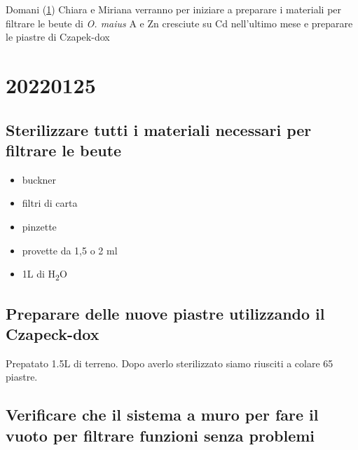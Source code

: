 \documentclass[
]{book}
\providecommand{\tightlist}{%
  \setlength{\itemsep}{0pt}\setlength{\parskip}{0pt}}
\begin{document}
Domani (\ref{D20220125}) Chiara e Miriana verranno per iniziare a preparare i materiali per filtrare le beute di \emph{O. maius} A e Zn cresciute su Cd nell'ultimo mese e preparare le piastre di Czapek-dox

\hypertarget{D20220125}{%
\section{20220125}\label{D20220125}}

\hypertarget{sterilizzare-tutti-i-materiali-necessari-per-filtrare-le-beute}{%
\subsection{Sterilizzare tutti i materiali necessari per filtrare le beute}\label{sterilizzare-tutti-i-materiali-necessari-per-filtrare-le-beute}}

\begin{itemize}
\tightlist
\item
  buckner\\
\item
  filtri di carta\\
\item
  pinzette\\
\item
  provette da 1,5 o 2 ml\\
\item
  1L di H\textsubscript{2}O
\end{itemize}

\hypertarget{preparare-delle-nuove-piastre-utilizzando-il-czapeck-dox}{%
\subsection{Preparare delle nuove piastre utilizzando il Czapeck-dox}\label{preparare-delle-nuove-piastre-utilizzando-il-czapeck-dox}}

Prepatato 1.5L di terreno. Dopo averlo sterilizzato siamo riusciti a colare 65 piastre.

\hypertarget{verificare-che-il-sistema-a-muro-per-fare-il-vuoto-per-filtrare-funzioni-senza-problemi}{%
\subsection{Verificare che il sistema a muro per fare il vuoto per filtrare funzioni senza problemi}\label{verificare-che-il-sistema-a-muro-per-fare-il-vuoto-per-filtrare-funzioni-senza-problemi}}
\end{document}
